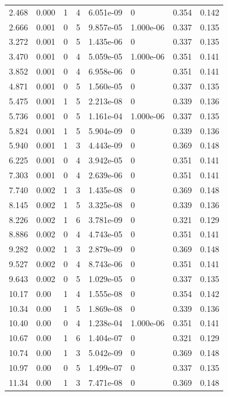 \documentclass[preview]{standalone}
\begin{document}
{{\begin{tabular}{L{1.2cm}C{1.2cm} C{0.3cm}C{0.5cm} C{1.4cm}C{1.4cm} C{1.4cm}C{1.4cm}}
  2.468  &  0.000  & 1     &  4 &  6.051e-09  & 0  & 0.354 &  0.142   \\ 
  2.666  &  0.001  & 0     &  5 &  9.857e-05  & 1.000e-06  & 0.337 &  0.135   \\ 
  3.272  &  0.001  & 0     &  5 &  1.435e-06  & 0  & 0.337 &  0.135   \\ 
  3.470  &  0.001  & 0     &  4 &  5.059e-05  & 1.000e-06  & 0.351 &  0.141   \\ 
  3.852  &  0.001  & 0     &  4 &  6.958e-06  & 0  & 0.351 &  0.141   \\ 
  4.871  &  0.001  & 0     &  5 &  1.560e-05  & 0  & 0.337 &  0.135   \\ 
  5.475  &  0.001  & 1     &  5 &  2.213e-08  & 0  & 0.339 &  0.136   \\ 
  5.736  &  0.001  & 0     &  5 &  1.161e-04  & 1.000e-06  & 0.337 &  0.135   \\ 
  5.824  &  0.001  & 1     &  5 &  5.904e-09  & 0  & 0.339 &  0.136   \\ 
  5.940  &  0.001  & 1     &  3 &  4.443e-09  & 0  & 0.369 &  0.148   \\ 
  6.225  &  0.001  & 0     &  4 &  3.942e-05  & 0  & 0.351 &  0.141   \\ 
  7.303  &  0.001  & 0     &  4 &  2.639e-06  & 0  & 0.351 &  0.141   \\ 
  7.740  &  0.002  & 1     &  3 &  1.435e-08  & 0  & 0.369 &  0.148   \\ 
  8.145  &  0.002  & 1     &  5 &  3.325e-08  & 0  & 0.339 &  0.136   \\ 
  8.226  &  0.002  & 1     &  6 &  3.781e-09  & 0  & 0.321 &  0.129   \\ 
  8.886  &  0.002  & 0     &  4 &  4.743e-05  & 0  & 0.351 &  0.141   \\ 
  9.282  &  0.002  & 1     &  3 &  2.879e-09  & 0  & 0.369 &  0.148   \\ 
  9.527  &  0.002  & 0     &  4 &  8.743e-06  & 0  & 0.351 &  0.141   \\ 
  9.643  &  0.002  & 0     &  5 &  1.029e-05  & 0  & 0.337 &  0.135   \\ 
  10.17  &  0.00  & 1     &  4 &  1.555e-08  & 0  & 0.354 &  0.142   \\ 
  10.34  &  0.00  & 1     &  5 &  1.869e-08  & 0  & 0.339 &  0.136   \\ 
  10.40  &  0.00  & 0     &  4 &  1.238e-04  & 1.000e-06  & 0.351 &  0.141   \\ 
  10.67  &  0.00  & 1     &  6 &  1.404e-07  & 0  & 0.321 &  0.129   \\ 
  10.74  &  0.00  & 1     &  3 &  5.042e-09  & 0  & 0.369 &  0.148   \\ 
  10.97  &  0.00  & 0     &  5 &  1.499e-07  & 0  & 0.337 &  0.135   \\ 
  11.34  &  0.00  & 1     &  3 &  7.471e-08  & 0  & 0.369 &  0.148   \\ 
\hline 
\end{tabular} 

}}
\end{document}
